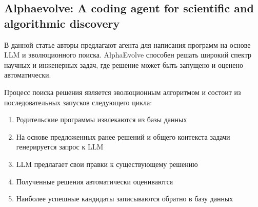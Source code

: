 \documentclass[a4paper,14pt]{extarticle}
\begin{document}
    

    

\newpage
\subsection{Alphaevolve: A coding agent for scientific and algorithmic discovery}

    В данной статье авторы предлагают агента для написания программ на основе LLM и эволюционного поиска.
    AlphaEvolve способен решать широкий спектр научных и инженерных задач, где решение может быть запущено и оценено автоматически.

    Процесс поиска решения является эволюционным алгоритмом и состоит из последовательных запусков следующего цикла:
    \begin{enumerate}
        \item Родительские программы извлекаются из базы данных
        \item На основе предложенных ранее решений и общего контекста задачи генерируется запрос к LLM 
        \item LLM предлагает свои правки к существующему решению
        \item Полученные решения автоматически оцениваются
        \item Наиболее успешные кандидаты записываются обратно в базу данных
    \end{enumerate}
\end{document}
